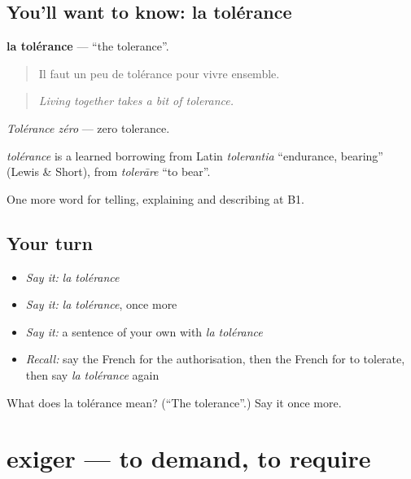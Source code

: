 \subsection*{You'll want to know: la tolérance}
\textbf{la tolérance} — \textquotedblleft{}the tolerance\textquotedblright{}.

\begin{quote}
Il faut un peu de tolérance pour vivre ensemble.
\end{quote}

\begin{quote}
\emph{Living together takes a bit of tolerance.}
\end{quote}

\emph{Tolérance zéro} — zero tolerance.

\begin{cousinweb}
\emph{tolérance} is a learned borrowing from Latin \emph{tolerantia} \textquotedblleft{}endurance, bearing\textquotedblright{} (Lewis \& Short), from \emph{tolerāre} \textquotedblleft{}to bear\textquotedblright{}.
\end{cousinweb}

\begin{grammarlens}[title={What you've built}]
One more word for telling, explaining and describing at B1.
\end{grammarlens}

\subsection*{Your turn}
\begin{itemize}
\raggedright
  \item \emph{Say it:} \emph{la tolérance}
  \item \emph{Say it:} \emph{la tolérance}, once more
  \item \emph{Say it:} a sentence of your own with \emph{la tolérance}
  \item \emph{Recall:} say the French for the authorisation, then the French for to tolerate, then say \emph{la tolérance} again
\end{itemize}

\begin{tcolorbox}[breakable,colback=teal!4,colframe=teal!35!black,title={Before you move on}]
What does la tolérance mean? (\textquotedblleft{}The tolerance\textquotedblright{}.) Say it once more.
\end{tcolorbox}
\section[exiger]{exiger — to demand, to require}

